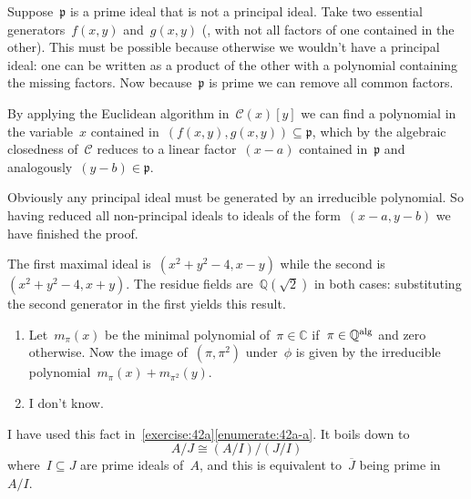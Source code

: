 \begin{exercise}
  \label{exercise:42d}
  Suppose~$\mathfrak{p}$ is a prime ideal that is not a principal ideal. Take two essential generators~$f(x,y)$ and~$g(x,y)$ (\ie, with not all factors of one contained in the other). This must be possible because otherwise we wouldn't have a principal ideal: one can be written as a product of the other with a polynomial containing the missing factors. Now because~$\mathfrak{p}$ is prime we can remove all common factors.

  By applying the Euclidean algorithm in~$\mathcal{C}(x)[y]$ we can find a polynomial in the variable~$x$ contained in~$(f(x,y),g(x,y))\subseteq\mathfrak{p}$, which by the algebraic closedness of~$\mathcal{C}$ reduces to a linear factor~$(x-a)$ contained in~$\mathfrak{p}$ and analogously~$(y-b)\in\mathfrak{p}$.

  Obviously any principal ideal must be generated by an irreducible polynomial. So having reduced all non-principal ideals to ideals of the form~$(x-a,y-b)$ we have finished the proof.
\end{exercise}

\begin{exercise}
  The first maximal ideal is~$(x^2+y^2-4,x-y)$ while the second is~$(x^2+y^2-4,x+y)$. The residue fields are~$\mathbb{Q}(\sqrt{2})$ in both cases: substituting the second generator in the first yields this result.
\end{exercise}

\begin{exercise}
  \label{exercise:42f}
  \begin{enumerate}
    \item Let~$m_\pi(x)$ be the minimal polynomial of~$\pi\in\mathbb{C}$ if~$\pi\in\mathbb{Q}^{\operatorname{alg}}$ and zero otherwise. Now the image of~$(\pi,\pi^2)$ under~$\phi$ is given by the irreducible polynomial~$m_{\pi}(x)+m_{\pi^2}(y)$.

    \item I don't know.
  \end{enumerate}
\end{exercise}

\begin{exercise}
  \label{exercise:42g}
  I have used this fact in~\autoref{exercise:42a}\ref{enumerate:42a-a}. It boils down to
  \begin{equation}
    A/J\cong (A/I)/(J/I) 
  \end{equation}
  where~$I\subseteq J$ are prime ideals of~$A$, and this is equivalent to~$\overline{J}$ being prime in~$A/I$.
\end{exercise}

